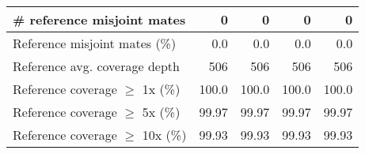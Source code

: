 \documentclass[12pt,a4paper]{article}
\begin{document}
\begin{table}[ht]
\begin{center}
\begin{tabular}{|l*{4}{|r}|}
\# reference misjoint mates & 0 & 0 & 0 & 0 \\ \hline
Reference misjoint mates (\%) & 0.0 & 0.0 & 0.0 & 0.0 \\ \hline
Reference avg. coverage depth & 506 & 506 & 506 & 506 \\ \hline
Reference coverage $\geq$ 1x (\%) & 100.0 & 100.0 & 100.0 & 100.0 \\ \hline
Reference coverage $\geq$ 5x (\%) & 99.97 & 99.97 & 99.97 & 99.97 \\ \hline
Reference coverage $\geq$ 10x (\%) & 99.93 & 99.93 & 99.93 & 99.93 \\ \hline
\end{tabular}
\end{center}
\end{table}
\end{document}
